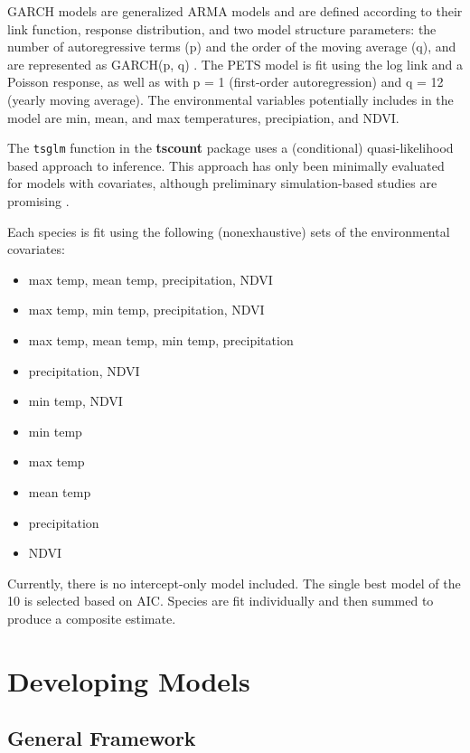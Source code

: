 \documentclass{article}
\def\code#1{\texttt{#1}}
\begin{document}
GARCH models are generalized ARMA models and are defined according to their link function, response distribution, and two model structure parameters: the number of autoregressive terms (p) and the order of the moving average (q), and are represented as GARCH(p, q) \citep{Liboschik2017a}. The PETS model is fit using the log link and a Poisson response, as well as with p = 1 (first-order autoregression) and q = 12 (yearly moving average). The environmental variables potentially includes in the model are min, mean, and max temperatures, precipiation, and NDVI. 

The \code{tsglm} function in the \textbf{tscount} package \citep{Liboschik2017a} uses a (conditional) quasi-likelihood based approach to inference. This approach has only been minimally evaluated for models with covariates, although preliminary simulation-based studies are promising \citep{Liboschik2017b}.  

Each species is fit using the following (nonexhaustive) sets of the environmental covariates:
\begin{itemize}
\item max temp, mean temp, precipitation, NDVI
\item max temp, min temp, precipitation, NDVI
\item max temp, mean temp, min temp, precipitation
\item precipitation, NDVI
\item min temp, NDVI
\item min temp
\item max temp
\item mean temp
\item precipitation 
\item NDVI
\end{itemize}

Currently, there is no intercept-only model included. The single best model of the 10 is selected based on AIC. Species are fit individually and then summed to produce a composite estimate. 

\section{Developing Models}
\label{sec:devmods}

\subsection{General Framework}
\label{subsec:devmods_gf}
\end{document}
